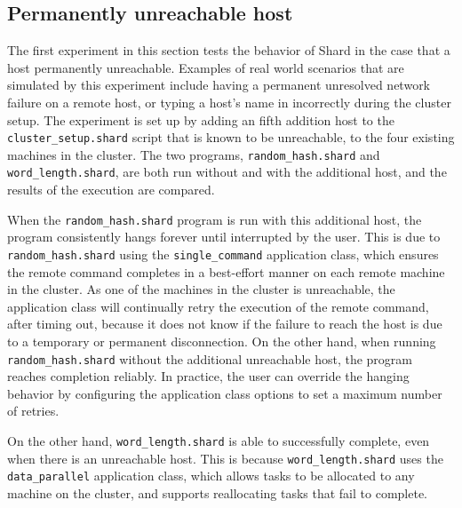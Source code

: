 \documentclass[oneside]{report}
\begin{document}
\subsection{Permanently unreachable host}
The first experiment in this section tests the behavior of Shard in the case that a host permanently unreachable.
Examples of real world scenarios that are simulated by this experiment include having a permanent unresolved network failure on a remote host, or typing a host's name in incorrectly during the cluster setup.
The experiment is set up by adding an fifth addition host to the \texttt{cluster\_setup.shard} script that is known to be unreachable, to the four existing machines in the cluster.
The two programs, \texttt{random\_hash.shard} and \texttt{word\_length.shard}, are both run without and with the additional host, and the results of the execution are compared.

\begin{sloppypar}
  When the \texttt{random\_hash.shard} program is run with this additional host, the program consistently hangs forever until interrupted by the user.
  This is due to \texttt{random\_hash.shard} using the \texttt{single\_command} application class, which ensures the remote command completes in a best-effort manner on each remote machine in the cluster.
  As one of the machines in the cluster is unreachable, the application class will continually retry the execution of the remote command, after timing out, because it does not know if the failure to reach the host is due to a temporary or permanent disconnection.
  On the other hand, when running \texttt{random\_hash.shard} without the additional unreachable host, the program reaches completion reliably.
  In practice, the user can override the hanging behavior by configuring the application class options to set a maximum number of retries.
\end{sloppypar}

On the other hand, \texttt{word\_length.shard} is able to successfully complete, even when there is an unreachable host.
This is because \texttt{word\_length.shard} uses the \texttt{data\_parallel} application class, which allows tasks to be allocated to any machine on the cluster, and supports reallocating tasks that fail to complete.
\end{document}
